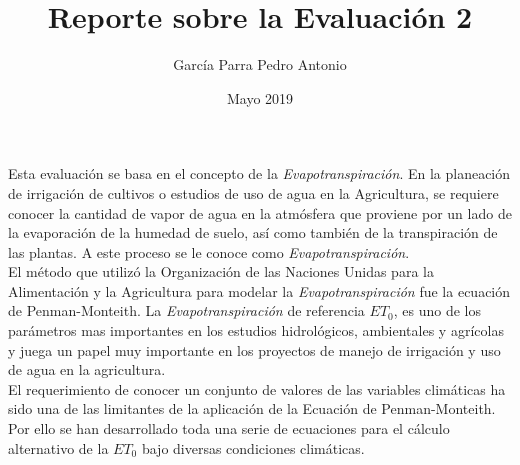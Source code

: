\documentclass[12pt]{article}
\title{Reporte sobre la Evaluaci\'on 2}
\author{García Parra Pedro Antonio}
\date{Mayo 2019}
\begin{document}
\maketitle
Esta evaluaci\'on se basa en el concepto de la \textit{Evapotranspiraci\'on}. En la planeaci\'on de irrigaci\'on de cultivos o estudios de uso de agua en la Agricultura, se requiere conocer la cantidad de vapor de agua en la atm\'osfera que proviene por un lado de la evaporaci\'on de la humedad de suelo, as\'i como tambi\'en de la transpiraci\'on de las plantas. A este proceso se le conoce como \textit{Evapotranspiraci\'on}.\\
El m\'etodo que utiliz\'o la Organizaci\'on de las Naciones Unidas para la Alimentaci\'on y la Agricultura para modelar la \textit{Evapotranspiraci\'on} fue la ecuaci\'on de Penman-Monteith. La \textit{Evapotranspiraci\'on} de referencia $ET_0$, es uno de los par\'ametros mas importantes en los estudios hidrol\'ogicos, ambientales y agr\'icolas y juega un papel muy importante en los proyectos de manejo de irrigaci\'on y uso de agua en la agricultura. \\ 
El requerimiento de conocer un conjunto de valores de las variables climáticas ha sido una de las limitantes de la aplicación de la Ecuación de Penman-Monteith. Por ello se han desarrollado toda una serie de ecuaciones para el cálculo alternativo de la $ET_0$ bajo diversas condiciones climáticas.\\
\end{document}
